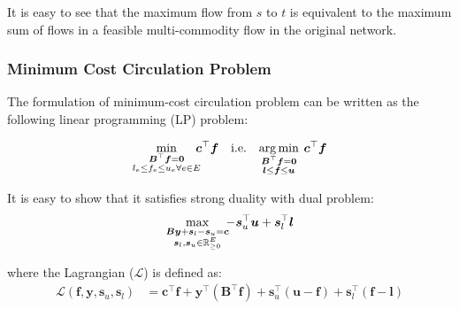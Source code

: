 \documentclass{article} %
\theoremstyle{bfnote}
\begin{document}
It is easy to see that the maximum flow from $s$ to $t$ is equivalent to the maximum sum of flows in a feasible multi-commodity flow in the original network.


\subsubsection{Minimum Cost Circulation Problem}

The formulation of minimum-cost circulation problem can be written as the following linear programming (LP) problem:

\begin{equation}
	\underset{\substack{\bm{B}^{\top} \bm{f}=\bm{0} \\ l_e \leq f_e \leq u_e \forall e \in E}}{\min } \hspace{-4pt} \bm{c}^{\top} \bm{f} \quad  \text{i.e.}	\quad 
	\underset{\substack{\bm{B}^{\top} \bm{f}=\bm{0} \\ \bm{l} \leq \bm{f} \leq \bm{u} }}{\arg \min } \hspace{4pt} \bm{c}^{\top} \bm{f}	
	\label{eq:5}
\end{equation}


It is easy to show that it satisfies strong duality with dual problem:
\begin{equation}
	\max _{\substack{\bm{B} \bm{y}+\bm{s}_{l}-\bm{s}_{u}=\bm{c}\\ \bm{s}_{l}, \bm{s}_{u} \in \mathbb{R}_{\geq 0}^E}} \hspace{-4pt} -\bm{s}_u^{\top} \bm{u}+\bm{s}_l^{\top} \bm{l}
	\label{eq:6}
\end{equation}

where the Lagrangian (\(\mathcal{L}\)) is defined as:
\[
\begin{aligned}
	\mathcal{L}(\bm{f}, \bm{y}, \bm{s}_{u}, \bm{s}_{l}) &= \bm{c}^{\top} \bm{f} + \bm{y}^{\top}(\bm{B}^{\top} \bm{f}) + \bm{s}_u^{\top}(\bm{u} - \bm{f}) + \bm{s}_l^{\top}(\bm{f} - \bm{l})
\end{aligned}
\]
\end{document}
